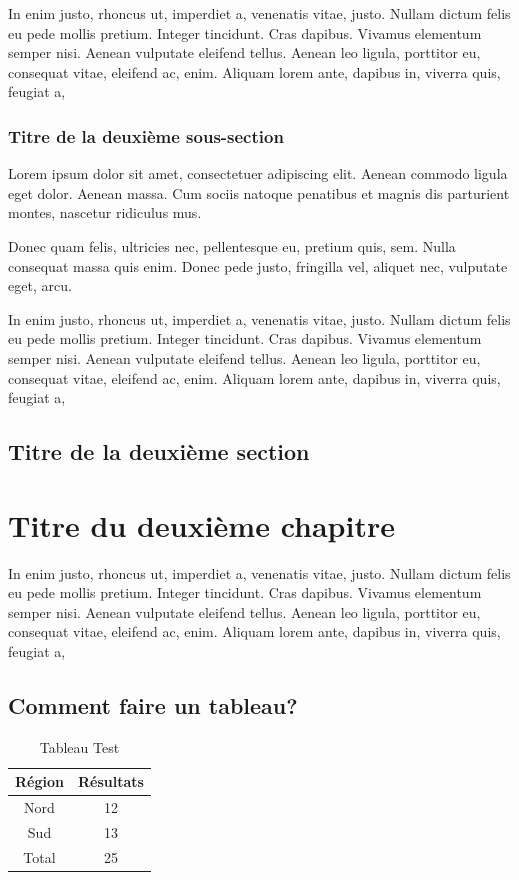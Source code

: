 \documentclass[a4paper,12 pt,twoside]{report}
\begin{document}
In enim justo, rhoncus ut, imperdiet a, venenatis vitae, justo.
Nullam dictum felis eu pede mollis pretium. Integer tincidunt. Cras
dapibus. Vivamus elementum semper nisi. Aenean vulputate eleifend
tellus. Aenean leo ligula, porttitor eu, consequat vitae, eleifend
ac, enim. Aliquam lorem ante, dapibus in, viverra quis, feugiat a,

\subsection{Titre de la deuxième sous-section}

Lorem ipsum dolor sit amet, consectetuer adipiscing elit. Aenean
commodo ligula eget dolor. Aenean massa. Cum sociis natoque
penatibus et magnis dis parturient montes, nascetur ridiculus mus.

Donec quam felis, ultricies nec, pellentesque eu, pretium quis, sem.
Nulla consequat massa quis enim. Donec pede justo, fringilla vel,
aliquet nec, vulputate eget, arcu.

In enim justo, rhoncus ut, imperdiet a, venenatis vitae, justo.
Nullam dictum felis eu pede mollis pretium. Integer tincidunt. Cras
dapibus. Vivamus elementum semper nisi. Aenean vulputate eleifend
tellus. Aenean leo ligula, porttitor eu, consequat vitae, eleifend
ac, enim. Aliquam lorem ante, dapibus in, viverra quis, feugiat
a,%


\section{Titre de la deuxième section}



\chapter {Titre du deuxième chapitre}
\thispagestyle {empty} In enim justo, rhoncus ut, imperdiet a,
venenatis vitae, justo. Nullam dictum felis eu pede mollis pretium.
Integer tincidunt. Cras dapibus. Vivamus elementum semper nisi.
Aenean vulputate eleifend tellus. Aenean leo ligula, porttitor eu,
consequat vitae, eleifend ac, enim. Aliquam lorem ante, dapibus in,
viverra quis, feugiat a,%

\section {Comment faire un tableau?}

\begin{table}[!h]
    \renewcommand{\tablename}{Tab}
    \centering
    \smallskip
    \begin{tabular}{|c|c|}
        \hline
            Région & Résultats \\
        \hline \hline
            Nord & 12 \\
        \cline{2-2}
            Sud & 13 \\
        \hline
            Total & 25 \\
        \hline
    \end{tabular}
    \caption{Tableau Test\label{Tab1}}
\end{table}
\end{document}
